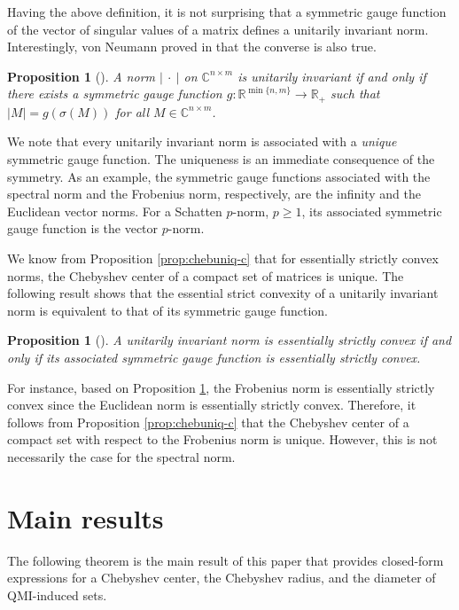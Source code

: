 \documentclass[pdflatex,sn-mathphys-num]{sn-jnl}%
\newcommand{\norm}[1]{\left|#1\right|}
\theoremstyle{thmstyleone}
\newtheorem{proposition}[theorem]{Proposition}
\begin{document}
Having the above definition, it is not surprising that a symmetric gauge function of the vector of singular values of a matrix defines a unitarily invariant norm. Interestingly, von Neumann proved in \cite{von1937some} that the converse is also true.

\begin{proposition}[{\cite[Fact 11.9.59]{bernstein2018scalar}}] A norm $\norm{\ \cdot\ }$ on $\mathbb{C}^{n\times m}$ is unitarily invariant if and only if there exists a symmetric gauge function $g:\mathbb{R}^{\min\{n,m\}}\rightarrow \mathbb{R}_+$ such that $\norm{M}=g(\sigma(M))$ for all $M\in\mathbb{C}^{n\times m}$. 
\end{proposition}

We note that every unitarily invariant norm is associated with a \emph{unique} symmetric gauge function. The uniqueness is an immediate consequence of the symmetry. As an example, the symmetric gauge functions associated with the spectral norm and the Frobenius norm, respectively, are the infinity and the Euclidean vector norms. For a Schatten $p$-norm, $p\geq 1$, its associated symmetric gauge function is the vector $p$-norm. 

We know from Proposition \ref{prop:chebuniq-c} that for essentially strictly convex norms, the Chebyshev center of a compact set of matrices is unique. The following result shows that the essential strict convexity of a unitarily invariant norm is equivalent to that of its symmetric gauge function. 
\begin{proposition}[{\cite[Thm. 3.1]{ziketak1988characterization}}]
\label{prop:uin_strict}
A unitarily invariant norm is essentially strictly convex if and only if its associated symmetric gauge function is essentially strictly convex. 
\end{proposition}

For instance, based on Proposition \ref{prop:uin_strict}, the Frobenius norm is essentially strictly convex since the Euclidean norm is essentially strictly convex. Therefore, it follows from Proposition \ref{prop:chebuniq-c} that the Chebyshev center of a compact set with respect to the Frobenius norm is unique. However, this is not necessarily the case for the spectral norm.

\section{Main results}
\label{sec:IV}


The following theorem is the main result of this paper that provides closed-form expressions for a Chebyshev center, the Chebyshev radius, and the diameter of QMI-induced sets. 
\end{document}

